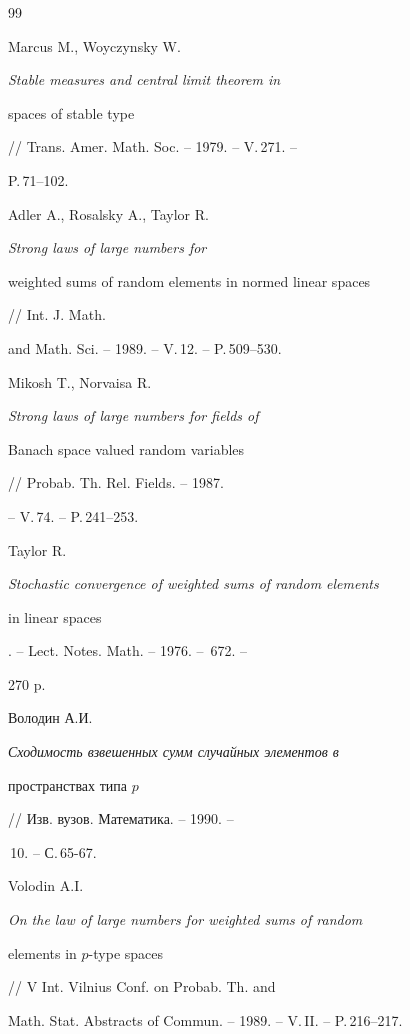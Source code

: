 \begin{thebibliography}{99}
 




Marcus M., Woyczynsky W. {\em Stable measures and central limit theorem in 


spaces of stable type} // Trans. Amer. Math. Soc. -- 1979. -- V.\,271. -- 


P.\,71--102. 


 




Adler A., Rosalsky A., Taylor R. {\em Strong laws of large numbers for 


weighted sums of random elements in normed linear spaces} // Int. J. Math. 


and Math. Sci. -- 1989. -- V.\,12. -- P.\,509--530. 


 




Mikosh T., Norvaisa R. {\em Strong laws of large numbers for fields of 


Banach space valued random variables} // Probab. Th. Rel. Fields. -- 1987. 


-- V.\,74. -- P.\,241--253. 


 




Taylor R. {\em Stochastic convergence of weighted sums of random elements 


in linear spaces}. -- Lect. Notes. Math. -- 1976. -- \No\,672. -- 


270 p.


 




Володин А.И. {\em Сходимость взвешенных сумм случайных элементов в 


пространствах типа $p$} // Изв. вузов. Математика. -- 1990. -- 


\No\,10. -- С.\,65-67. 


 




Volodin A.I. {\em On the law of large numbers for weighted sums of random 


elements in $p$-type spaces} // V Int. Vilnius Conf. on Probab. Th. and 


Math. Stat. Abstracts of Commun. -- 1989. -- V.\,II. -- P.\,216--217. 



\end{thebibliography}
